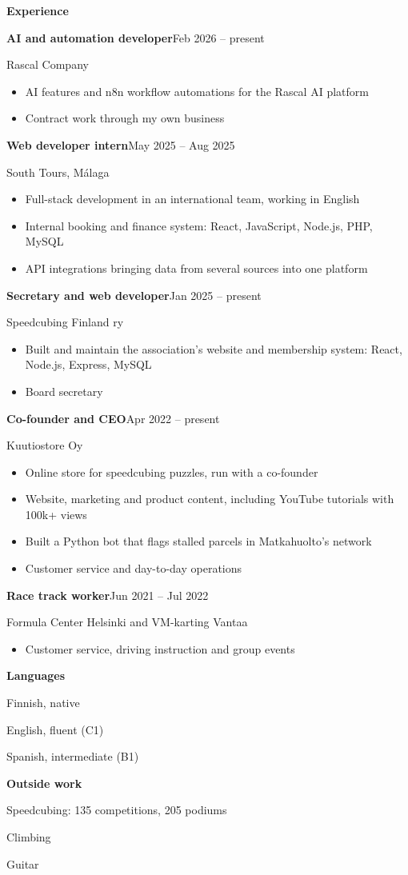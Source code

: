 \documentclass[10pt]{article}
\newcommand{\cvsection}[1]{{\fontsize{12.5}{15}\selectfont\bfseries #1}\par\vspace{3pt}{\color{line}\rule{\linewidth}{0.6pt}}\par\vspace{6pt}}
\newcommand{\entry}[3]{{\fontsize{10.5}{13}\selectfont\bfseries #1}\hfill{\color{muted}#3}\par{\color{muted}#2}\par}
\newcommand{\entryend}{\par\vspace{9pt}}
\begin{document}
\begin{minipage}[t]{0.62\linewidth}
\cvsection{Experience}
\entry{AI and automation developer}{Rascal Company}{Feb 2026 – present}
\begin{itemize}
  \item AI features and n8n workflow automations for the Rascal AI platform
  \item Contract work through my own business
\end{itemize}
\entryend
\entry{Web developer intern}{South Tours, Málaga}{May 2025 – Aug 2025}
\begin{itemize}
  \item Full-stack development in an international team, working in English
  \item Internal booking and finance system: React, JavaScript, Node.js, PHP, MySQL
  \item API integrations bringing data from several sources into one platform
\end{itemize}
\entryend
\entry{Secretary and web developer}{Speedcubing Finland ry}{Jan 2025 – present}
\begin{itemize}
  \item Built and maintain the association's website and membership system: React, Node.js, Express, MySQL
  \item Board secretary
\end{itemize}
\entryend
\entry{Co-founder and CEO}{Kuutiostore Oy}{Apr 2022 – present}
\begin{itemize}
  \item Online store for speedcubing puzzles, run with a co-founder
  \item Website, marketing and product content, including YouTube tutorials with 100k+ views
  \item Built a Python bot that flags stalled parcels in Matkahuolto's network
  \item Customer service and day-to-day operations
\end{itemize}
\entryend
\entry{Race track worker}{Formula Center Helsinki and VM-karting Vantaa}{Jun 2021 – Jul 2022}
\begin{itemize}
  \item Customer service, driving instruction and group events
\end{itemize}
\entryend
\vspace{4pt}
\begin{minipage}[t]{0.47\linewidth}
\cvsection{Languages}
Finnish, native\par
English, fluent (C1)\par
Spanish, intermediate (B1)\par
\end{minipage}\hfill
\begin{minipage}[t]{0.47\linewidth}
\cvsection{Outside work}
Speedcubing: 135 competitions, 205 podiums\par
Climbing\par
Guitar\par
\end{minipage}


\end{minipage}
\end{document}
